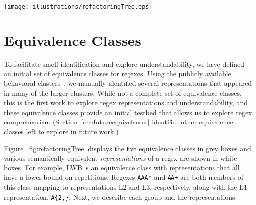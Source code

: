 

\begin{figure*}[tb]
\centering
\texttt{[image: illustrations/refactoringTree.eps]}
\vspace{-6pt}
\caption{Equivalence classes with various representations. DBB = Double-Bounded, SNG = Single Bounded, LWB = Lower Bounded, CCC = Custom Character Class and LIT = Literal. We use concrete regexes in the representations for illustration. However, the A's in the LWB group (or B's in DBB group, S's in SNG group, and so forth) abstractly represent any pattern that could be operated on by a repetition modifier (e.g., literal characters, character classes, or groups). The same is true for the literals used in all the representations. }
\vspace{-6pt}
\label{fig:refactoringTree}
\end{figure*}




\section{Equivalence Classes}
\label{sec:refactoring}
To facilitate smell identification and explore understandability, we have defined an initial set of equivalence classes for regexes. 
Using the publicly available behavioral clusters~\cite{chapman2016}, we manually identified several representations that appeared in many of the larger clusters. 
While not a complete set of equivalence classes, this is the first work to explore regex representations and understandability, and these equivalence classes provide an initial testbed that allows us to explore regex comprehension. (Section~\ref{sec:futureequivclasses} identifies other equivalence classes left to explore in future work.)

Figure~\ref{fig:refactoringTree} displays the five equivalence classes in grey boxes and various semantically equivalent \emph{representations} of a regex are shown in white boxes. For example, LWB is an equivalence class with representations that all have a lower bound on repetitions. Regexes \verb!AAA*! and \verb!AA+!  are both members of this class mapping to representations L2 and L3, respectively, along with the L1 representation, \verb!A{2,}!.
Next, we describe each group and the representations.

